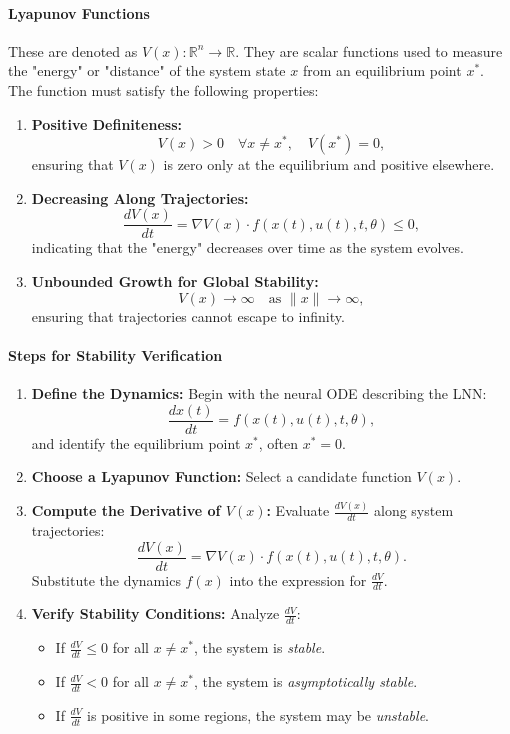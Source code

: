 \paragraph{Lyapunov Functions} These are denoted as \(V(x): \mathbb{R}^n \to \mathbb{R}\). They are scalar functions used to measure the "energy" or "distance" of the system state \(x\) from an equilibrium point \(x^*\). The function must satisfy the following properties:
\begin{enumerate}
    \item \textbf{Positive Definiteness:}
    \[
    V(x) > 0 \quad \forall x \neq x^*, \quad V(x^*) = 0,
    \]
    ensuring that \(V(x)\) is zero only at the equilibrium and positive elsewhere.
    \item \textbf{Decreasing Along Trajectories:}
    \[
    \frac{dV(x)}{dt} = \nabla V(x) \cdot f(x(t), u(t), t, \theta) \leq 0,
    \]
    indicating that the "energy" decreases over time as the system evolves.
    \item \textbf{Unbounded Growth for Global Stability:}
    \[
    V(x) \to \infty \quad \text{as } \|x\| \to \infty,
    \]
    ensuring that trajectories cannot escape to infinity.
\end{enumerate}

\paragraph{Steps for Stability Verification}
\begin{enumerate}
    \item \textbf{Define the Dynamics:} Begin with the neural ODE describing the LNN:
    \[
    \frac{dx(t)}{dt} = f(x(t), u(t), t, \theta),
    \]
    and identify the equilibrium point \(x^*\), often \(x^* = 0\).
    \item \textbf{Choose a Lyapunov Function:} Select a candidate function \(V(x)\).
    \item \textbf{Compute the Derivative of \(V(x)\):} Evaluate \(\frac{dV(x)}{dt}\) along system trajectories:
    \[
    \frac{dV(x)}{dt} = \nabla V(x) \cdot f(x(t), u(t), t, \theta).
    \]
    Substitute the dynamics \(f(x)\) into the expression for \(\frac{dV}{dt}\).
    \item \textbf{Verify Stability Conditions:} Analyze \(\frac{dV}{dt}\):
    \begin{itemize}
        \item If \(\frac{dV}{dt} \leq 0\) for all \(x \neq x^*\), the system is \textit{stable}.
        \item If \(\frac{dV}{dt} < 0\) for all \(x \neq x^*\), the system is \textit{asymptotically stable}.
        \item If \(\frac{dV}{dt}\) is positive in some regions, the system may be \textit{unstable}.
    \end{itemize}
\end{enumerate}

